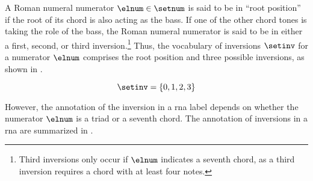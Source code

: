 
A Roman numeral numerator $\elnum \in \setnum$ is said to be
in ``root position'' if the root of its chord is also acting
as the bass. If one of the other chord tones is taking the
role of the bass, the Roman numeral numerator is said to be
in either a first, second, or third
inversion.\footnote{Third inversions only occur if $\elnum$
indicates a seventh chord, as a third inversion requires a
chord with at least four notes.} Thus, the vocabulary of
inversions $\setinv$ for a numerator $\elnum$ comprises the
root position and three possible inversions, as shown in
.

\begin{equation}
    \label{eq:inversion_vocabulary}
    \setinv = \{ 0, 1, 2, 3 \}
\end{equation}


However, the annotation of the inversion in a \gls{rna}
label depends on whether the numerator $\elnum$ is a triad
or a seventh chord. The annotation of inversions in a
\gls{rna} are summarized in .


        
